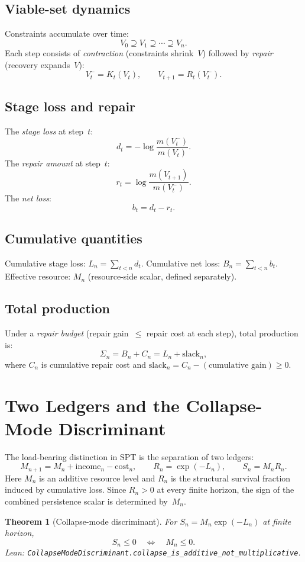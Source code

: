 \documentclass[11pt,a4paper]{article}
\newtheorem{theorem}{Theorem}[section]
\begin{document}
\subsection{Viable-set dynamics}

Constraints accumulate over time:
\[
V_0 \supseteq V_1 \supseteq \cdots \supseteq V_n.
\]
Each step consists of \emph{contraction} (constraints shrink~$V$) followed by \emph{repair} (recovery expands~$V$):
\[
V_t^{-} = K_t(V_t), \qquad V_{t+1} = R_t(V_t^{-}).
\]

\subsection{Stage loss and repair}

The \emph{stage loss} at step~$t$:
\[
d_t = -\log\frac{m(V_t^{-})}{m(V_t)}.
\]
The \emph{repair amount} at step~$t$:
\[
r_t = \log\frac{m(V_{t+1})}{m(V_t^{-})}.
\]
The \emph{net loss}:
\[
b_t = d_t - r_t.
\]

\subsection{Cumulative quantities}

Cumulative stage loss: $L_n = \sum_{t<n} d_t$. Cumulative net loss: $B_n = \sum_{t<n} b_t$. Effective resource: $M_n$ (resource-side scalar, defined separately).

\subsection{Total production}

Under a \emph{repair budget} (repair gain~$\leq$ repair cost at each step), total production is:
\[
\Sigma_n = B_n + C_n = L_n + \text{slack}_n,
\]
where $C_n$ is cumulative repair cost and $\text{slack}_n = C_n - (\text{cumulative gain}) \geq 0$.

\section{Two Ledgers and the Collapse-Mode Discriminant}\label{sec:ml-discriminant}

The load-bearing distinction in SPT is the separation of two ledgers:
\[
M_{n+1}=M_n+\mathrm{income}_n-\mathrm{cost}_n,\qquad
R_n=\exp(-L_n),\qquad
S_n=M_n R_n .
\]
Here $M_n$ is an additive resource level and $R_n$ is the structural survival fraction induced by cumulative loss. Since $R_n>0$ at every finite horizon, the sign of the combined persistence scalar is determined by~$M_n$.
\begin{theorem}[Collapse-mode discriminant]
For $S_n=M_n\exp(-L_n)$ at finite horizon,
\[
S_n \leq 0 \quad \Longleftrightarrow \quad M_n \leq 0 .
\]
Lean: \texttt{CollapseModeDiscriminant.collapse\_is\_additive\_not\_multiplicative}.
\end{theorem}
\end{document}
